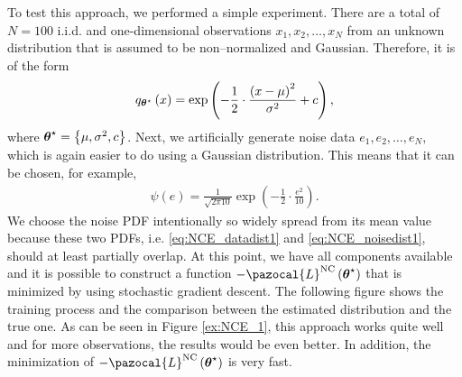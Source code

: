 To test this approach, we performed a simple experiment. There are a total of $N = 100$ i.i.d. and one-dimensional observations $x_1,x_2,\dots,x_N$ from an unknown distribution that is assumed to be non--normalized and Gaussian. Therefore, it is of the form
\begin{align}\label{eq:NCE_datadist1}
    q_{\boldsymbol{\theta}^\star}\left(x\right) = \exp\left(-\frac{1}{2}\cdot\frac{\left(x-\mu\right)^2}{\sigma^2} + c \right),
\end{align} 
where $\boldsymbol{\theta}^\star = \left\lbrace \mu, \sigma^2, c \right\rbrace$. Next, we artificially generate noise data $e_1,e_2,\dots,e_N$, which is again easier to do using a Gaussian distribution. This means that it can be chosen, for example,
\begin{align}\label{eq:NCE_noisedist1}
    \psi\left(e\right) = \frac{1}{\sqrt{2\pi 10}}\exp\left(-\frac{1}{2}\cdot\frac{e^2}{10} \right).
\end{align}
We choose the noise PDF intentionally so widely spread from its mean value because these two PDFs, i.e. \eqref{eq:NCE_datadist1} and \eqref{eq:NCE_noisedist1}, should at least partially overlap. At this point, we have all components available and it is possible to construct a function $-\pazocal{L}^{\mathrm{NC}}\left(\bt^\star\right)$ that is minimized by using stochastic gradient descent. The following figure shows the training process and the comparison between
the estimated distribution and the true one. As can be seen in Figure \ref{ex:NCE_1}, this approach works quite well and for more observations, the results would be even better. In addition, the minimization of $-\pazocal{L}^{\mathrm{NC}}\left(\bt^\star\right)$ is very fast.


